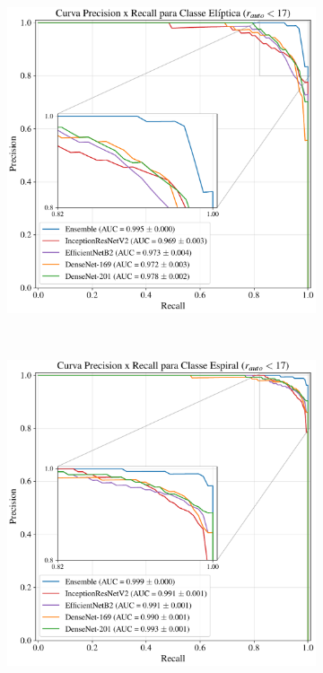 \newpage

\begin{figure}[!ht]%
  \centering
  \begin{subfigure}{.62\linewidth}%
    \includegraphics[width=\linewidth]{figures/pr_mn170_E.pdf}
  \end{subfigure}\\[4pt]
  \begin{subfigure}{.62\linewidth}%
    \includegraphics[width=\linewidth]{figures/pr_mn170_S.pdf}

\end{subfigure}
\end{figure}

